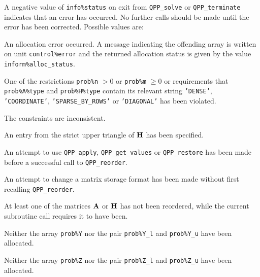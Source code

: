 \documentclass{galahad}
\newcommand{\packagename}{QPP}
\begin{document}

\galerrors
A negative value of {\tt info\%status} on exit from 
{\tt \packagename\_solve}
or 
{\tt \packagename\_terminate}
indicates that an error has occurred. No further calls should be made
until the error has been corrected. Possible values are:

\begin{description}

 An allocation error occurred. 
A message indicating the offending 
 array is written on unit {\tt control\%error} and the returned allocation 
 status is given by the value {\tt inform\%alloc\_status}.

 One of the restrictions 
{\tt prob\%n} $> 0$ or {\tt prob\%m} $\geq  0$
    or requirements that {\tt prob\%A\%type} 
    and {\tt prob\%H\%type} contain its relevant string
    {\tt 'DENSE'}, {\tt 'COORDINATE'}, {\tt 'SPARSE\_BY\_ROWS'} 
    or {\tt 'DIAGONAL'}
    has been violated.


 The constraints are inconsistent.

 An entry from the strict upper triangle of ${\mathbf{H}}$ 
 has been specified.

 An attempt to use 
{\tt \packagename\_apply}, {\tt \packagename\_get\_values} 
or {\tt \packagename\_restore} 
has been made before a successful call to {\tt \packagename\_reorder}. 
 
 An attempt to change a matrix storage format has been made 
without first recalling {\tt \packagename\_reorder}. 
 
 At least one of the matrices ${\mathbf{A}}$ or ${\mathbf{H}}$ has not been reordered, 
while the current subroutine call requires it to have been. 

 Neither the array {\tt prob\%Y} nor the pair {\tt prob\%Y\_l} and
{\tt prob\%Y\_u} have been allocated.

 Neither the array {\tt prob\%Z} nor the pair {\tt prob\%Z\_l} and
{\tt prob\%Z\_u} have been allocated.

\end{description}
\end{document}
